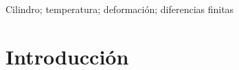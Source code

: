 \documentclass[journal, monochrome]{IEEEtran}
\begin{document}












\maketitle

\renewcommand{\abstractname}{Resumen}


\renewcommand{\IEEEkeywordsname}{Palabras clave}
\renewcommand{\refname}{Referencias}
\renewcommand{\tablename}{Tabla}

\begin{abstract}
\boldmath

\end{abstract}

\begin{IEEEkeywords}
Cilindro; temperatura; deformación; diferencias finitas
\end{IEEEkeywords}








%
\IEEEpeerreviewmaketitle
\vspace{1cm}

\section{Introducción}


\vspace{1cm}
\end{document}
